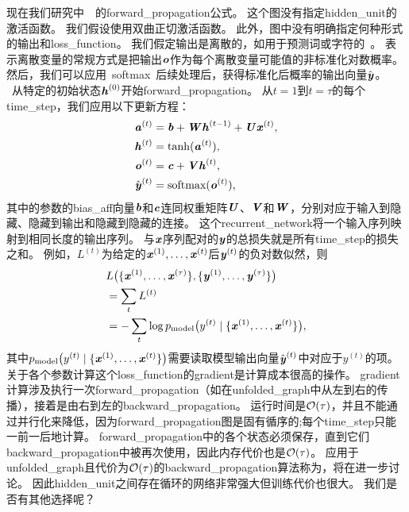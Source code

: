 现在我们研究中~~的\gls{forward_propagation}公式。
这个图没有指定\gls{hidden_unit}的激活函数。
我们假设使用双曲正切激活函数。
此外，图中没有明确指定何种形式的输出和\gls{loss_function}。
我们假定输出是离散的，如用于预测词或字符的~。
表示离散变量的常规方式是把输出$\boldsymbol{\mathit{o}}$作为每个离散变量可能值的非标准化对数概率。
然后，我们可以应用~\gls{softmax}~后续处理后，获得标准化后概率的输出向量$\hat {\boldsymbol{\mathit{y}}}$。
~从特定的初始状态$\boldsymbol{\mathit{h}}^{(0)}$开始\gls{forward_propagation}。
从$t= 1$到$t = \tau$的每个\gls{time_step}，我们应用以下更新方程：
\begin{align}
\label{eq:108a}
 \boldsymbol{\mathit{a}}^{(t)} &= \boldsymbol{\mathit{b}} + \boldsymbol{\mathit{W}} \boldsymbol{\mathit{h}}^{(t-1)} + \boldsymbol{\mathit{U}} \boldsymbol{\mathit{x}}^{(t)}, \\
  \boldsymbol{\mathit{h}}^{(t)} &= \tanh(\boldsymbol{\mathit{a}}^{(t)} ), \\
  \boldsymbol{\mathit{o}}^{(t)} &= \boldsymbol{\mathit{c}} + \boldsymbol{\mathit{V}} \boldsymbol{\mathit{h}}^{(t)}, \\
  \hat {\boldsymbol{\mathit{y}}}^{(t)} &= \text{softmax}(\boldsymbol{\mathit{o}}^{(t)}),
\end{align}
其中的参数的\gls{bias_aff}向量$\boldsymbol{\mathit{b}}$和$\boldsymbol{\mathit{c}}$连同权重矩阵$\boldsymbol{\mathit{U}}$、$\boldsymbol{\mathit{V}}$和$\boldsymbol{\mathit{W}}$，分别对应于输入到隐藏、隐藏到输出和隐藏到隐藏的连接。
这个\gls{recurrent_network}将一个输入序列映射到相同长度的输出序列。
与$\boldsymbol{\mathit{x}}$序列配对的$\boldsymbol{\mathit{y}}$的总损失就是所有\gls{time_step}的损失之和。
例如，$L^{(t)}$为给定的$\boldsymbol{\mathit{x}}^{(1)}, \dots, \boldsymbol{\mathit{x}}^{(t)}$后$\boldsymbol{\mathit{y}}^{(t)}$的负对数似然，则
\begin{align} \label{eq:1012L}
 & L\big( \{ \boldsymbol{\mathit{x}}^{(1)}, \dots, \boldsymbol{\mathit{x}}^{(\tau)} \}, \{ \boldsymbol{\mathit{y}}^{(1)}, \dots, \boldsymbol{\mathit{y}}^{(\tau)}  \} \big) \\
 & = \sum_t L^{(t)} \\
 & = - \sum_t \log p_{\text{model}} \big(  y^{(t)} \mid  \{ \boldsymbol{\mathit{x}}^{(1)}, \dots, \boldsymbol{\mathit{x}}^{(t)} \} \big) ,
\end{align}
其中$p_{\text{model}} \big(  y^{(t)} \mid  \{ \boldsymbol{\mathit{x}}^{(1)}, \dots, \boldsymbol{\mathit{x}}^{(t)} \} \big) $需要读取模型输出向量$\hat {\boldsymbol{\mathit{y}}}^{(t)}$中对应于$y^{(t)}$的项。
关于各个参数计算这个\gls{loss_function}的\gls{gradient}是计算成本很高的操作。
\gls{gradient}计算涉及执行一次\gls{forward_propagation}（如在\gls{unfolded_graph}中从左到右的传播），接着是由右到左的\gls{backward_propagation}。
运行时间是$\mathcal{O}(\tau)$，并且不能通过并行化来降低，因为\gls{forward_propagation}图是固有循序的;每个\gls{time_step}只能一前一后地计算。
\gls{forward_propagation}中的各个状态必须保存，直到它们\gls{backward_propagation}中被再次使用，因此内存代价也是$\mathcal{O}(\tau)$。
应用于\gls{unfolded_graph}且代价为$\mathcal{O}(\tau)$的\gls{backward_propagation}算法称为，将在进一步讨论。
因此\gls{hidden_unit}之间存在循环的网络非常强大但训练代价也很大。
我们是否有其他选择呢？

